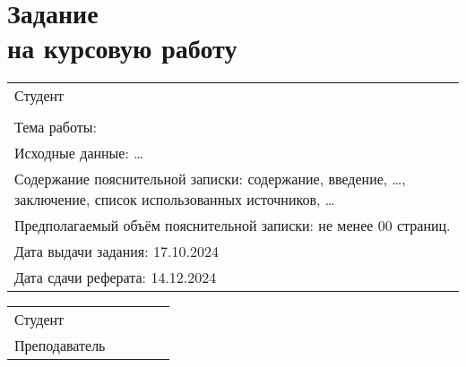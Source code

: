 \section*{Задание\\ на курсовую работу}

\setlength{\extrarowheight}{7mm}
\begin{tabularx}{\textwidth}{>{\raggedright\arraybackslash}X}
	Студент \student{}                                                                                                   \\
	\group                                                                                                               \\
	Тема работы: \theme                                                                                                  \\
	Исходные данные: \ldots                                                                                              \\
	Содержание пояснительной записки: содержание, введение, \ldots, заключение, список использованных источников, \ldots \\
	Предполагаемый объём пояснительной записки: не менее 00 страниц.                                                     \\
	Дата выдачи задания: 17.10.2024                                                                                      \\
	Дата сдачи реферата: 14.12.2024                                                                                      \\
\end{tabularx}
\setlength{\extrarowheight}{0mm}

\vspace{50mm}

\setlength{\extrarowheight}{4mm}
\begin{tabulary}{\textwidth}{LCCCL}
	Студент & \hspace{0.5cm} & \hspace{4.5cm} & \hspace{0.5cm} & \student \\
	Преподаватель & \hspace{0.5cm} & \hspace{4.5cm} & \hspace{0.5cm} & \teacher \\
\end{tabulary}
\setlength{\extrarowheight}{0mm}


